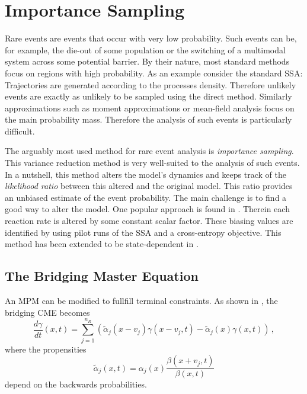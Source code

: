 \chapter{Importance Sampling}
Rare events are events that occur with very low probability.
Such events can be, for example, the die-out of some population or the switching of a multimodal system across some potential barrier.
By their nature, most standard methods focus on regions with high probability.
As an example consider the standard \ac{SSA}:
Trajectories are generated according to the processes density.
Therefore unlikely events are exactly as unlikely to be sampled using the direct method.
Similarly approximations such as moment approximations or mean-field analysis focus on the main probability mass.
Therefore the analysis of such events is particularly difficult.

The arguably most used method for rare event analysis is \emph{importance sampling}.
This variance reduction method is very well-suited to the analysis of such events.
In a nutshell, this method alters the model's dynamics and keeps track of the \emph{likelihood ratio} between this altered and the original model.
This ratio provides an unbiased estimate of the event probability.
The main challenge is to find a good way to alter the model.
One popular approach is found in  \parencite{kuwahara2008efficient,daigle2011automated}.
Therein each reaction rate is altered by some constant scalar factor.
These biasing values are identified by using pilot runs of the \ac{SSA} and a cross-entropy objective.
This method has been extended to be state-dependent in \citet{roh2011state}.

\section{The Bridging Master Equation}
An \ac{MPM} can be modified to fullfill terminal constraints.
As shown in \citet{huang2016reconstructing}, the bridging \ac{CME} becomes
\begin{equation}
    \frac{d\gamma}{d t} ( x,t) =
    \sum_{j=1}^{n_R}\left(
        \tilde{\alpha}_j( x- v_j)\gamma( x- v_j,t) - \tilde{\alpha}_j( x)\gamma( x,t)
    \right)\,,
\end{equation}
where the propensities
\begin{equation}
    \tilde{\alpha}_j(x, t) = \alpha_j(x)\frac{\beta(x + v_j, t)}{\beta(x, t)}
\end{equation}
depend on the backwards probabilities.

